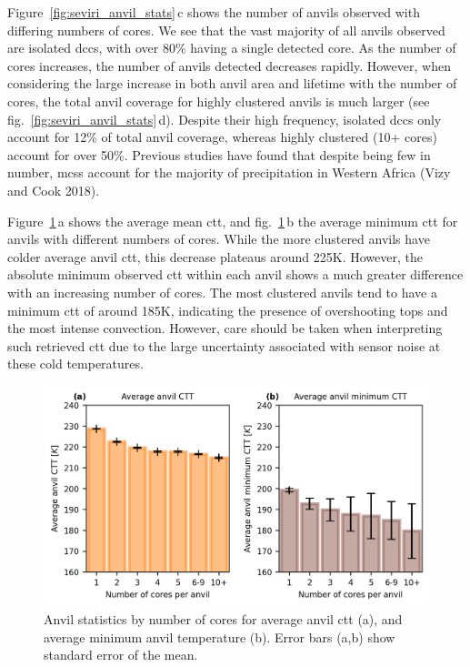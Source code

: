 Figure~\ref{fig:seviri_anvil_stats}\,c shows the number of anvils observed with differing numbers
of cores. We see that the vast majority of all anvils observed are
isolated \acrshort{dcc}s, with over 80\% having a single detected core. As the
number of cores increases, the number of anvils detected decreases
rapidly. However, when considering the large increase in both anvil area
and lifetime with the number of cores, the total anvil coverage for
highly clustered anvils is much larger (see fig.~\ref{fig:seviri_anvil_stats}\,d). Despite their
high frequency, isolated \acrshort{dcc}s only account for 12\% of total anvil
coverage, whereas highly clustered (10+ cores) account for over 50\%.
Previous studies have found that despite being few in number, \acrshort{mcs}s
account for the majority of precipitation in Western Africa (Vizy and
Cook 2018).

Figure~\ref{fig:seviri_anvil_ctt_stats}\,a shows the average mean \acrshort{ctt}, and fig.~\ref{fig:seviri_anvil_ctt_stats}\,b the average minimum \acrshort{ctt} for anvils with different numbers of cores.
While the more clustered anvils have colder average anvil \acrshort{ctt}, this
decrease plateaus around 225K. However, the absolute minimum observed
\acrshort{ctt} within each anvil shows a much greater difference with an increasing
number of cores. The most clustered anvils tend to have a minimum \acrshort{ctt} of
around 185K, indicating the presence of overshooting tops and the most
intense convection. However, care should be taken when interpreting such
retrieved \acrshort{ctt} due to the large uncertainty associated with sensor noise
at these cold temperatures.


\begin{figure}[tp]
    \includegraphics[width=\textwidth]{figures/ch3_07.png}
    \caption[
    Anvil statistics by number of cores for average anvil \acrshort{ctt} and average minimum anvil temperature
    ]{
    Anvil statistics by number of cores for average anvil \acrshort{ctt} (a), and average minimum anvil temperature (b). Error bars (a,b) show standard error of the mean.
    }
    \label{fig:seviri_anvil_ctt_stats}
\end{figure}


